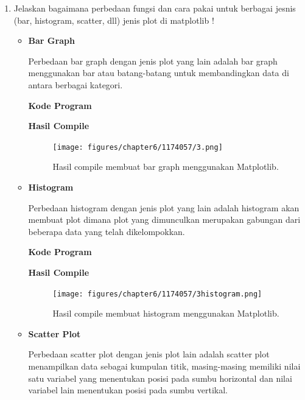 \begin{enumerate}
		
		\item Jelaskan bagaimana perbedaan fungsi dan cara pakai untuk berbagai jesnis (bar, histogram, scatter, dll) jenis plot di matplotlib !
			\begin{itemize}
				\item \textbf{Bar Graph}
				
				Perbedaan bar graph dengan jenis plot yang lain adalah bar graph menggunakan bar atau batang-batang untuk membandingkan data di antara berbagai kategori.
				
				\textbf{Kode Program}
				
				
				
				\textbf{Hasil Compile}
				
				\begin{figure}[H]
					\texttt{[image: figures/chapter6/1174057/3.png]}
					\centering
					\caption{Hasil compile membuat bar graph menggunakan Matplotlib.}
				\end{figure}
				
				\item \textbf{Histogram}
				
				Perbedaan histogram dengan jenis plot yang lain adalah histogram akan membuat plot dimana plot yang dimunculkan merupakan gabungan dari beberapa data yang telah dikelompokkan.
				
				\textbf{Kode Program}
				
				
				
				\textbf{Hasil Compile}
				
				\begin{figure}[H]
					\texttt{[image: figures/chapter6/1174057/3histogram.png]}
					\centering
					\caption{Hasil compile membuat histogram menggunakan Matplotlib.}
				\end{figure}
				
				\item \textbf{Scatter Plot}
				
				Perbedaan scatter plot dengan jenis plot lain adalah scatter plot menampilkan data sebagai kumpulan titik, masing-masing memiliki nilai satu variabel yang menentukan posisi pada sumbu horizontal dan nilai variabel lain menentukan posisi pada sumbu vertikal.
				

\end{itemize}
\end{enumerate}
